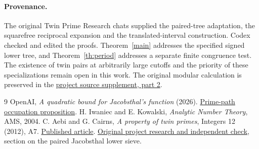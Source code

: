 \documentclass[11pt]{article}
\begin{document}
\paragraph{Provenance.} The original Twin Prime Research chats supplied
the paired-tree adaptation, the squarefree reciprocal expansion and the
translated-interval construction. Codex checked and edited the proofs.
Theorem~\ref{main} addresses the specified signed lower tree, and
Theorem~\ref{th:period} addresses a separate finite congruence test.
The existence of twin pairs at arbitrarily large cutoffs and the
priority of these specializations remain open in this work.
The original modular calculation is preserved in the
\href{https://github.com/cosmosgeek0/Twin-Prime/blob/main/history/hosted-proofs-supplement.md}{project source supplement, part 2}.
\begin{thebibliography}{9}
OpenAI, \emph{A quadratic bound for Jacobsthal's function} (2026). \href{https://github.com/openai/math/blob/main/preprints/A-quadratic-bound-for-Jacobsthals-function-September-25-2026/build/sections/prime-paths.tex}{Prime-path occupation proposition}.
H. Iwaniec and E. Kowalski, \emph{Analytic Number Theory}, AMS, 2004.
C. Aebi and G. Cairns, \emph{A property of twin primes},
Integers 12 (2012), A7.
\href{https://math.colgate.edu/~integers/m7/m7.pdf}{Published article}.
\href{https://github.com/cosmosgeek0/Twin-Prime/blob/main/history/hosted-research-responses-2026-11-25.md}{Original project research and independent check}, section on the paired Jacobsthal lower sieve.
\end{thebibliography}
\end{document}
